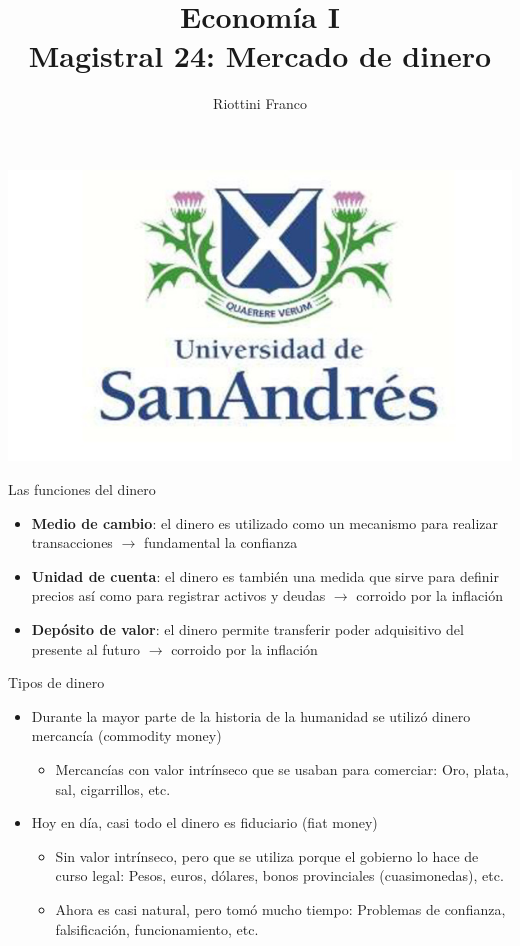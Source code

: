 \documentclass{beamer}
\title[Economía I]{Economía I \vspace{4mm}
\\ Magistral 24: Mercado de dinero}
\date{}
\author[Riottini]{Riottini Franco}
\institute[]{Universidad de San Andrés}
\begin{document}
\begin{frame}
\titlepage
\centering
\includegraphics[scale=0.2]{../Figures/logoUDESA.jpg} 
\end{frame}

\begin{frame}{Las funciones del dinero}
    \begin{itemize}
        \item \textbf{Medio de cambio}: el dinero es utilizado como un mecanismo para realizar transacciones $\rightarrow$ fundamental la confianza
        \item \textbf{Unidad de cuenta}: el dinero es también una medida que sirve para definir precios así como para registrar activos y deudas $\rightarrow$ corroido por la inflación
        \item \textbf{Depósito de valor}: el dinero permite transferir poder adquisitivo del presente al futuro $\rightarrow$ corroido por la inflación
   \end{itemize}
\end{frame}

\begin{frame}{Tipos de dinero}
    \begin{itemize}
        \item Durante la mayor parte de la historia de la humanidad se utilizó dinero mercancía (commodity money)
            \begin{itemize}
                \item Mercancías con valor intrínseco que se usaban para comerciar: Oro, plata, sal, cigarrillos, etc.
            \end{itemize}
        \item Hoy en día, casi todo el dinero es fiduciario (fiat money)               
        \begin{itemize}
            \item Sin valor intrínseco, pero que se utiliza porque el gobierno lo hace de curso legal: Pesos, euros, dólares, bonos provinciales (cuasimonedas), etc.
            \item Ahora es casi natural, pero tomó mucho tiempo: Problemas de confianza, falsificación, funcionamiento, etc.
        \end{itemize}
    \end{itemize}
\end{frame}
\end{document}
